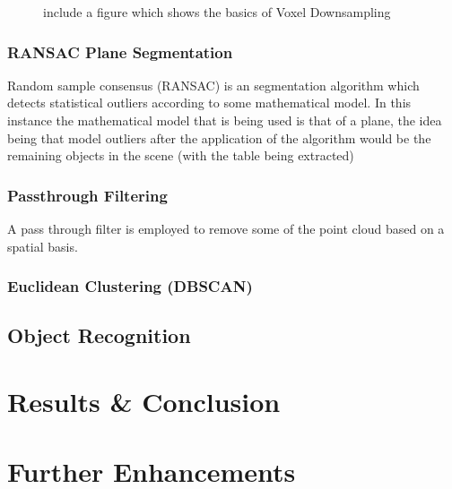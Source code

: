 \documentclass[a4paper]{article}
\begin{document}
\begin{figure}
\centering
\caption{include a figure which shows the basics of Voxel Downsampling}
\end{figure}

\subsubsection{RANSAC Plane Segmentation}
Random sample consensus (RANSAC) is an segmentation algorithm which detects statistical outliers according to some mathematical model. In this instance the mathematical model that is being used is that of a plane, the idea being that model outliers after the application of the algorithm would be the remaining objects in the scene (with the table being extracted)

\subsubsection{Passthrough Filtering}
A pass through filter is employed to remove some of the point cloud based on a spatial basis.

\subsubsection{Euclidean Clustering (DBSCAN)}


\subsection{Object Recognition}


\section{Results \& Conclusion}


\section{Further Enhancements}
\end{document}
